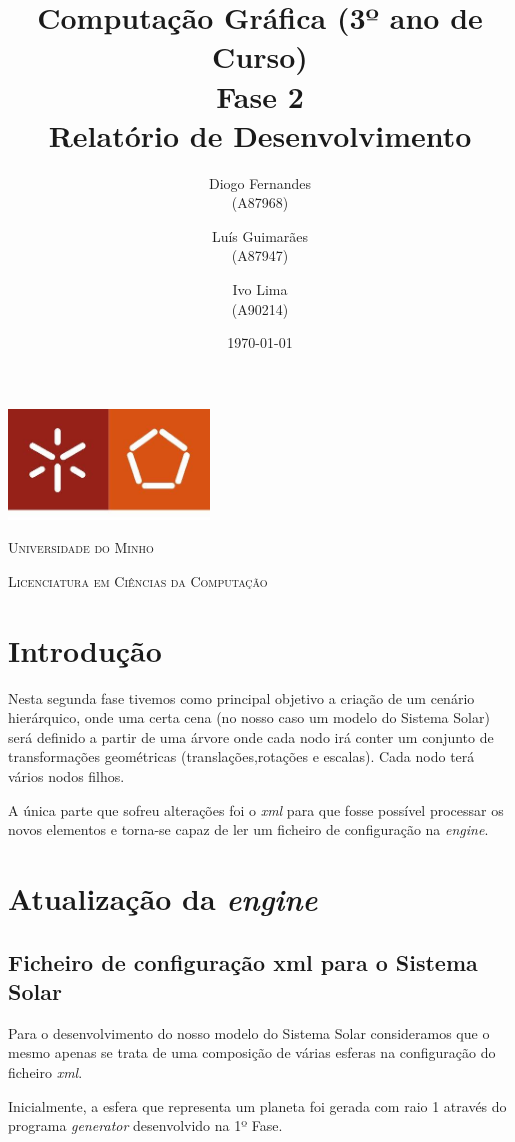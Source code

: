 \documentclass[11pt,a4paper]{report}
\title{Computação Gráfica (3º ano de Curso)\\
       \textbf{Fase 2}\\ Relatório de Desenvolvimento
       } %
\author{Diogo Fernandes\\ (A87968) \and Luís Guimarães\\ (A87947)
         \and Ivo Lima\\ (A90214)
       } %
\date{\today} %
\begin{document}
	\begin{minipage}{0.9\linewidth}
        \centering
		\includegraphics[width=0.4\textwidth]{um.jpeg}\par\vspace{1cm}
		{\scshape\LARGE Universidade do Minho} \par
		\vspace{0.6cm}
		{\scshape\Large Licenciatura em Ciências da Computação} \par
		\maketitle
	\end{minipage}

\tableofcontents %

\chapter{Introdução}

Nesta segunda fase tivemos como principal objetivo a criação de um cenário hierárquico, onde uma certa cena (no nosso caso um modelo do Sistema Solar) será definido a partir de uma árvore onde cada nodo irá conter um conjunto de transformações geométricas (translações,rotações e escalas). Cada nodo terá vários nodos filhos.

A única parte que sofreu alterações foi o \emph{xml} para que fosse possível processar os novos elementos e torna-se capaz de ler um ficheiro de configuração na \emph{engine}.

\chapter{Atualização da \emph{engine}}
\section{Ficheiro de configuração xml para o Sistema Solar}
Para o desenvolvimento do nosso modelo do Sistema Solar consideramos que o mesmo apenas se trata de uma composição de várias esferas na configuração do ficheiro  \emph{xml}.

Inicialmente, a esfera que representa um planeta foi gerada com raio 1 através do programa \emph{generator} desenvolvido na 1º Fase.
\end{document}

